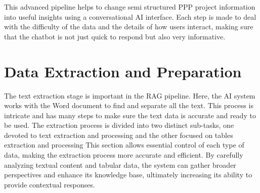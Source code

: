 \vskip 0.5cm
This advanced pipeline helps to change semi structured PPP project information into useful insights using a conversational AI interface. Each step is made to deal with the difficulty of the data and the details of how users interact, making sure that the chatbot is not just quick to respond but also very informative.

\section{Data Extraction and Preparation}
The text extraction stage is important in the RAG pipeline. Here, the AI system works with the Word document to find and separate all the text. This process is intricate and has many steps to make sure the text data is accurate and ready to be used.
\vskip 0.5cm
The extraction process is divided into two distinct sub-tasks, one devoted to text extraction and processing  and the other focused on tables extraction and processing This section allows essential control of each type of data, making the extraction process more accurate and efficient. By carefully analyzing textual content and tabular data, the system can gather broader perspectives and enhance its knowledge base, ultimately increasing its ability to provide contextual responses.

